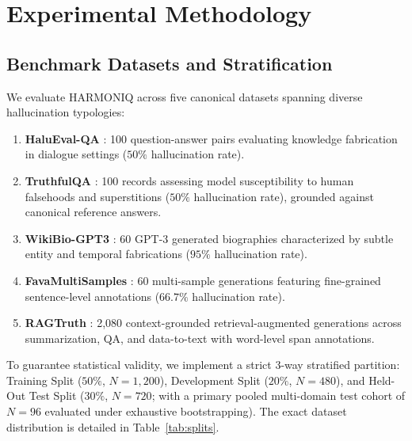 \documentclass[conference]{IEEEtran}
\begin{document}
\section{Experimental Methodology}

\subsection{Benchmark Datasets and Stratification}
We evaluate HARMONIQ across five canonical datasets spanning diverse hallucination typologies:
\begin{enumerate}
    \item \textbf{HaluEval-QA} \cite{b13}: 100 question-answer pairs evaluating knowledge fabrication in dialogue settings ($50\%$ hallucination rate).
    \item \textbf{TruthfulQA} \cite{b14}: 100 records assessing model susceptibility to human falsehoods and superstitions ($50\%$ hallucination rate), grounded against canonical reference answers.
    \item \textbf{WikiBio-GPT3} \cite{b4}: 60 GPT-3 generated biographies characterized by subtle entity and temporal fabrications ($95\%$ hallucination rate).
    \item \textbf{FavaMultiSamples} \cite{b15}: 60 multi-sample generations featuring fine-grained sentence-level annotations ($66.7\%$ hallucination rate).
    \item \textbf{RAGTruth} \cite{b17}: 2,080 context-grounded retrieval-augmented generations across summarization, QA, and data-to-text with word-level span annotations.
\end{enumerate}

To guarantee statistical validity, we implement a strict 3-way stratified partition: Training Split ($50\%$, $N=1,200$), Development Split ($20\%$, $N=480$), and Held-Out Test Split ($30\%$, $N=720$; with a primary pooled multi-domain test cohort of $N=96$ evaluated under exhaustive bootstrapping). The exact dataset distribution is detailed in Table~\ref{tab:splits}.
\end{document}
